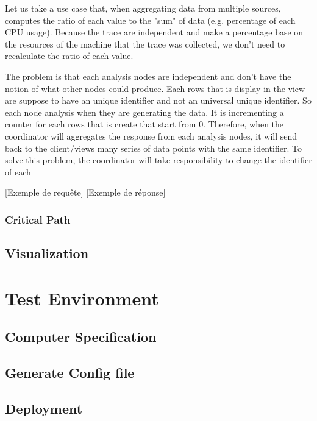 Let us take a use case that, when aggregating data from multiple sources, computes the ratio of each value to the "sum" of data (e.g. percentage of each CPU usage). Because the trace are independent and make a percentage base on the resources of the machine that the trace was collected, we don't need to recalculate the ratio of each value. 

The problem is that each analysis nodes are independent and don't have the notion of what other nodes could produce. Each rows that is display in the view are suppose to have an unique identifier and not an universal unique identifier. So each node analysis when they are generating the data. It is incrementing a counter for each rows that is create that start from 0. Therefore, when the coordinator will aggregates the response from each analysis nodes, it will send back to the client/views many series of data points with the same identifier. To solve this problem, the coordinator will take responsibility to change the identifier of each 



[Exemple de requête]
[Exemple de réponse]
\subsubsection{Critical Path}

\subsection{Visualization}


\section{Test Environment}

\subsection{Computer Specification}

\subsection{Generate Config file}

\subsection{Deployment}

